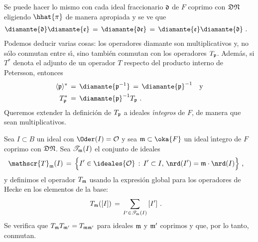 Se puede hacer lo mismo con cada ideal fraccionario $\frak{d}$ de $F$ coprimo
con $\frak{D}\frak{N}$ eligiendo $\hhat{\pi}$ de manera apropiada y se ve que
\begin{align*}
	\diamante{\frak{d}} \diamante{\frak{e}} & \,=\,
		\diamante{\frak{d}\frak{e}}
		\,=\,\diamante{\frak{e}}\diamante{\frak{d}}
	\text{ .}
\end{align*}
%
Podemos deducir varias cosas: los operadores diamante son multiplicativos y, no
s\'{o}lo conmutan entre s\'{\i}, sino tambi\'{e}n conmutan con los operadores
$T_{\frak{p}}$. Adem\'{a}s, si $T^{*}$ denota el adjunto de un operador $T$
respecto del producto interno de Petersson, entonces
\begin{align*}
	\langle\frak{p}\rangle^{*} & \,=\,
		\diamante{\frak{p}^{-1}} \,=\,\diamante{\frak{p}}^{-1}
			\quad\text{y} \\
	T_{\frak{p}}^{*} & \,=\, \diamante{\frak{p}}^{-1}T_{\frak{p}}
	\text{ .}
\end{align*}
%
Queremos extender la definici\'{o}n de $T_{\frak{p}}$ a ideales
\emph{\'{\i}ntegros} de $F$, de manera que sean multiplicativos.
%

Sea $I\subset B$ un ideal con $\Oder(I)=\cal{O}$ y sea $\frak{m}\subset\oka{F}$
un ideal \'{\i}ntegro de $F$ coprimo con $\frak{D}\frak{N}$.
Sea $\mathscr{T}_{\frak{m}}(I)$ el conjunto de ideales
\begin{align*}
	\mathscr{T}_{\frak{m}}(I) & \,=\,
		\Big\{ I'\in\ideales{\cal{O}}\,:\,
			I'\subset I,\,\nrd(I')=\frak{m}\cdot\nrd(I)\Big\}
	\text{ ,}
\end{align*}
%
y definimos el operador $T_{\frak{m}}$ usando la expresi\'{o}n global para los
operadores de Hecke en los elementos de la base:
\begin{align*}
	T_{\frak{m}}([I]) & \,=\,
		\sum_{I'\in\mathscr{T}_{\frak{m}}(I)}\,[I']
	\text{ .}
\end{align*}
%
Se verifica que $T_{\frak{m}}T_{\frak{m}'}=T_{\frak{m}\frak{m}'}$ para ideales
$\frak{m}$ y $\frak{m}'$ coprimos y que, por lo tanto, conmutan.

